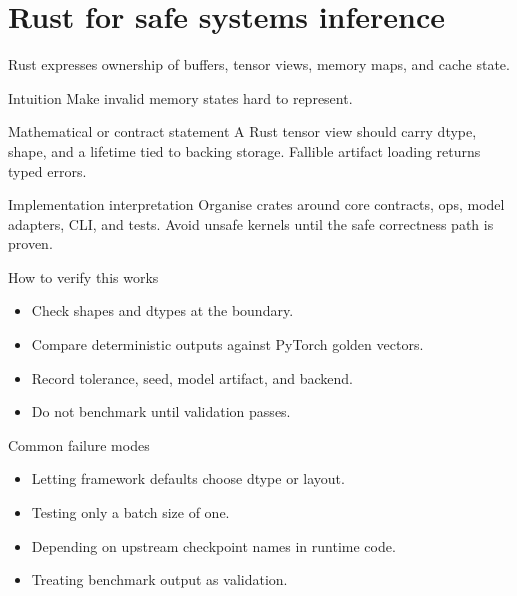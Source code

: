 \chapter{Rust for safe systems inference}
\label{ch:rust}
Rust expresses ownership of buffers, tensor views, memory maps, and cache state. \citep{rustBook,rust2024edition}



\begin{intuitionbox}{Intuition}
Make invalid memory states hard to represent.
\end{intuitionbox}

\begin{definitionbox}{Mathematical or contract statement}
A Rust tensor view should carry dtype, shape, and a lifetime tied to backing storage. Fallible artifact loading returns typed errors.
\end{definitionbox}

\begin{implementationbox}{Implementation interpretation}
Organise crates around core contracts, ops, model adapters, CLI, and tests. Avoid unsafe kernels until the safe correctness path is proven.
\end{implementationbox}

\begin{verificationbox}{How to verify this works}
\begin{itemize}
\item Check shapes and dtypes at the boundary.
\item Compare deterministic outputs against PyTorch golden vectors.
\item Record tolerance, seed, model artifact, and backend.
\item Do not benchmark until validation passes.
\end{itemize}
\end{verificationbox}

\begin{warningbox}{Common failure modes}
\begin{itemize}
\item Letting framework defaults choose dtype or layout.
\item Testing only a batch size of one.
\item Depending on upstream checkpoint names in runtime code.
\item Treating benchmark output as validation.
\end{itemize}
\end{warningbox}

